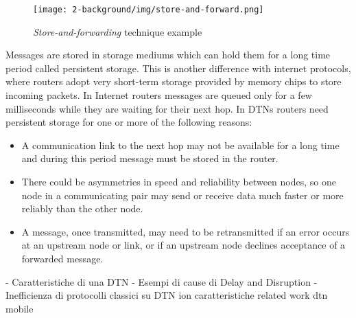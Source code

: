 \begin{figure}[htpb]
  \begin{center}
    \texttt{[image: 2-background/img/store-and-forward.png]}
    \caption{\textit{Store-and-forwarding} technique example}    
    \label{fig:store-carry-forward}
  \end{center}
\end{figure}

Messages are stored in storage mediums which can hold them for a long time period called persistent storage. This is another difference with internet protocols, where routers adopt very short-term storage provided by memory chips to store incoming packets. In Internet routers messages are queued only for a few milliseconds while they are waiting for their next hop. In DTNs routers need persistent storage for one or more of the following reasons:
\begin{itemize}
\item A communication link to the next hop may not be available for a long time and during this period message must be stored in the router.
\item There could be asymmetries in speed and reliability between nodes, so one node in a communicating pair may send or receive data much faster or more reliably than the other node.
\item A message, once transmitted, may need to be retransmitted if an error occurs at an upstream node or link, or if an upstream node declines acceptance of a forwarded message.
\end{itemize}



 
 
 


- Caratteristiche di una DTN 
   - Esempi di cause di Delay and Disruption
   - Inefficienza di protocolli classici su DTN ion caratteristiche
related work dtn mobile



